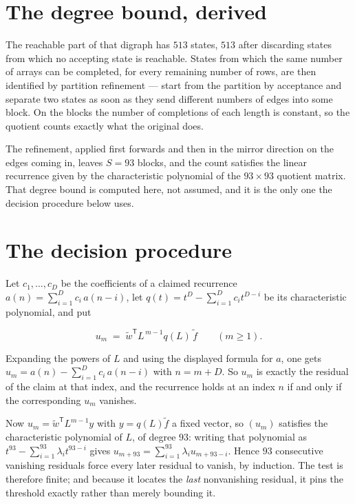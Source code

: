 \documentclass[11pt]{article}
\theoremstyle{definition}
\begin{document}
\section{The degree bound, derived}

The reachable part of that digraph has $513$ states, $513$ after discarding states from which no accepting state is reachable. States from which the same number of arrays can be completed, for every remaining number of rows, are then identified by partition refinement --- start from the partition by acceptance and separate two states as soon as they send different numbers of edges into some block. On the blocks the number of completions of each length is constant, so the quotient counts exactly what the original does.

The refinement, applied first forwards and then in the mirror direction on the edges coming in, leaves $S = 93$ blocks, and the count satisfies the linear recurrence given by the characteristic polynomial of the $93 \times 93$ quotient matrix. That degree bound is computed here, not assumed, and it is the only one the decision procedure below uses.

\section{The decision procedure}

Let $c_1,\dots,c_D$ be the coefficients of a claimed recurrence $a(n) = \sum_{i=1}^{D} c_i\,a(n-i)$, let $q(t) = t^{D} - \sum_{i=1}^{D} c_i t^{D-i}$ be its characteristic polynomial, and put

\[u_m \;=\; \tilde w^{\mathsf T} L^{\,m-1} q(L)\,\tilde f \qquad (m \ge 1).\]

Expanding the powers of $L$ and using the displayed formula for $a$, one gets $u_m = a(n) - \sum_{i=1}^{D} c_i\,a(n-i)$ with $n = m + D$. So $u_m$ is exactly the residual of the claim at that index, and the recurrence holds at an index $n$ if and only if the corresponding $u_m$ vanishes.

Now $u_m = \tilde w^{\mathsf T} L^{m-1} y$ with $y = q(L)\tilde f$ a fixed vector, so $(u_m)$ satisfies the characteristic polynomial of $L$, of degree $93$: writing that polynomial as $t^{93} - \sum_{i=1}^{93} \lambda_i t^{93-i}$ gives $u_{m+93} = \sum_{i=1}^{93} \lambda_i u_{m+93-i}$. Hence $93$ consecutive vanishing residuals force every later residual to vanish, by induction. The test is therefore finite; and because it locates the {\itshape last} nonvanishing residual, it pins the threshold exactly rather than merely bounding it.
\end{document}
